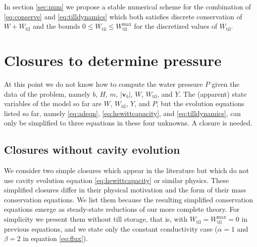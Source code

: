 \documentclass[gmd]{copernicus}   %
\newcommand{\text}{\textrm}
\newcommand\bv{\mathbf{v}}
\newcommand{\Wtil}{W_{\text{til}}}
\newcommand{\Wtilmax}{W_{\text{til}}^{\text{max}}}
\begin{document}
In section \ref{sec:num} we propose a stable numerical scheme for the combination of \eqref{eq:conserve} and \eqref{eq:tilldynamics} which both satisfies discrete conservation of $W+\Wtil$ and the bounds $0\le \Wtil \le \Wtilmax$ for the discretized values of $\Wtil$.  


\section{Closures to determine pressure} \label{sec:closures}

At this point we do not know how to compute the water pressure $P$ given the data of the problem, namely $b$, $H$, $m$, $|\bv_b|$, $W$, $\Wtil$, and $Y$.  The (apparent) state variables of the model so far are $W$, $\Wtil$, $Y$, and $P$, but the evolution equations listed so far, namely \eqref{eq:adeqn}, \eqref{eq:hewittcapacity}, and \eqref{eq:tilldynamics}, can only be simplified to three equations in these four unknowns.   A closure is needed.

\subsection{Closures without cavity evolution}  We consider two simple closures which appear in the literature but which do not use cavity evolution equation \eqref{eq:hewittcapacity} or similar physics.  These simplified closures differ in their physical motivation and the form of their mass conservation equations.  We list them because the resulting simplified conservation equations emerge as steady-state reductions of our more complete theory.  For simplicity we present them without till storage, that is, with $\Wtil=\Wtilmax=0$ in previous equations, and we state only the constant conductivity case ($\alpha=1$ and $\beta=2$ in equation \eqref{eq:flux}).
\end{document}
